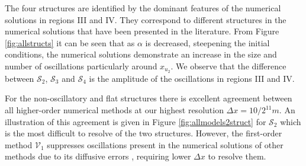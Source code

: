 \documentclass[times]{elsarticle}
\begin{document}
The four structures are identified by the dominant features of the numerical solutions in regions III and IV. They correspond to different structures in the numerical solutions that have been presented in the literature. From Figure \ref{fig:allstructs} it can be seen that as $\alpha$ is decreased, steepening the initial conditions, the numerical solutions demonstrate an increase in the size and number of oscillations particularly around $x_{u_2}$. We observe that the difference between $\mathcal{S}_2$, $\mathcal{S}_3$ and $\mathcal{S}_4$ is the amplitude of the oscillations in regions III and IV.

For the non-oscillatory and flat structures there is excellent agreement between all higher-order numerical methods at our highest resolution $\Delta x = 10/2^{11}m$. An illustration of this agreement is given in Figure \ref{fig:allmodels2struct} for $\mathcal{S}_2$ which is the most difficult to resolve of the two structures. However, the first-order method $\mathcal{V}_1$ suppresses oscillations present in the numerical solutions of other methods due to its diffusive errors \cite{Zoppou-etal-2017}, requiring lower $\Delta x$ to resolve them.
\end{document}
